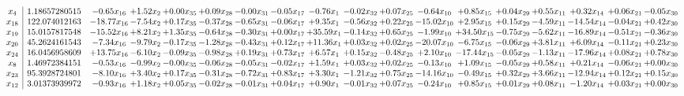 \documentclass[9pt]{article}
\begin{document}
 \[\begin{array}{c| c c@{\hskip 2pt} c@{\hskip 2pt} c@{\hskip 2pt} c@{\hskip 2pt} c@{\hskip 2pt} c@{\hskip 2pt} c@{\hskip 2pt} c@{\hskip 2pt} c@{\hskip 2pt} c@{\hskip 2pt} c@{\hskip 2pt} c@{\hskip 2pt} c@{\hskip 2pt} c@{\hskip 2pt} c@{\hskip 2pt} c@{\hskip 2pt} }
 x_{4}   &  1.18657280515 & -0.65 x_{16} & +  1.52 x_{2} & +  0.00 x_{35} & +  0.09 x_{28} & -0.00 x_{31} & -0.05 x_{17} & -0.76 x_{1} & -0.02 x_{32} & +  0.07 x_{25} & -0.64 x_{10} & +  0.85 x_{15} & +  0.04 x_{29} & +  0.55 x_{11} & +  0.32 x_{14} & +  0.06 x_{21} & -0.05 x_{30}\\
 x_{18}   &  122.074012163 & -18.77 x_{16} & -7.54 x_{2} & +  0.17 x_{35} & -0.37 x_{28} & -0.65 x_{31} & -0.06 x_{17} & +  9.35 x_{1} & -0.56 x_{32} & +  0.22 x_{25} & -15.02 x_{10} & +  2.95 x_{15} & +  0.15 x_{29} & -4.59 x_{11} & -14.54 x_{14} & -0.04 x_{21} & +  0.42 x_{30}\\
 x_{19}   &  15.0157817548 & -15.52 x_{16} & +  8.21 x_{2} & +  1.35 x_{35} & -0.64 x_{28} & -0.30 x_{31} & +  0.00 x_{17} & + 35.59 x_{1} & -0.14 x_{32} & +  0.65 x_{25} & -1.99 x_{10} & + 34.50 x_{15} & -0.75 x_{29} & -5.62 x_{11} & -16.89 x_{14} & -0.51 x_{21} & -0.36 x_{30}\\
 x_{20}   &  45.2624161543 & -7.34 x_{16} & -9.79 x_{2} & -0.17 x_{35} & -1.28 x_{28} & -0.43 x_{31} & +  0.12 x_{17} & + 11.36 x_{1} & +  0.03 x_{32} & +  0.02 x_{25} & -20.07 x_{10} & -6.75 x_{15} & -0.06 x_{29} & +  3.81 x_{11} & +  6.09 x_{14} & -0.11 x_{21} & +  0.23 x_{30}\\
 x_{24}   &  16.0456958609 & + 13.75 x_{16} & -6.10 x_{2} & -0.09 x_{35} & -0.98 x_{28} & +  0.19 x_{31} & +  0.73 x_{17} & +  6.57 x_{1} & +  0.15 x_{32} & -0.48 x_{25} & +  2.10 x_{10} & -17.44 x_{15} & -0.05 x_{29} & -1.13 x_{11} & -17.96 x_{14} & +  0.08 x_{21} & +  0.78 x_{30}\\
 x_{8}   &  1.46972384151 & -0.53 x_{16} & -0.99 x_{2} & -0.00 x_{35} & -0.06 x_{28} & -0.05 x_{31} & -0.02 x_{17} & +  1.59 x_{1} & +  0.03 x_{32} & +  0.02 x_{25} & -0.13 x_{10} & +  1.09 x_{15} & -0.05 x_{29} & +  0.58 x_{11} & +  0.21 x_{14} & -0.06 x_{21} & +  0.00 x_{30}\\
 x_{23}   &  95.3928724801 & -8.10 x_{16} & +  3.40 x_{2} & +  0.17 x_{35} & -0.31 x_{28} & -0.72 x_{31} & +  0.83 x_{17} & +  3.30 x_{1} & -1.21 x_{32} & +  0.75 x_{25} & -14.16 x_{10} & -0.49 x_{15} & +  0.32 x_{29} & +  3.66 x_{11} & -12.94 x_{14} & +  0.12 x_{21} & +  0.15 x_{30}\\
 x_{12}   &  3.01373939972 & -0.93 x_{16} & +  1.18 x_{2} & +  0.05 x_{35} & -0.02 x_{28} & -0.01 x_{31} & +  0.04 x_{17} & +  0.90 x_{1} & -0.01 x_{32} & +  0.07 x_{25} & -0.24 x_{10} & +  0.85 x_{15} & +  0.01 x_{29} & +  0.08 x_{11} & -1.20 x_{14} & +  0.03 x_{21} & +  0.00 x_{30}\\

\end{array}\]
\end{document}
